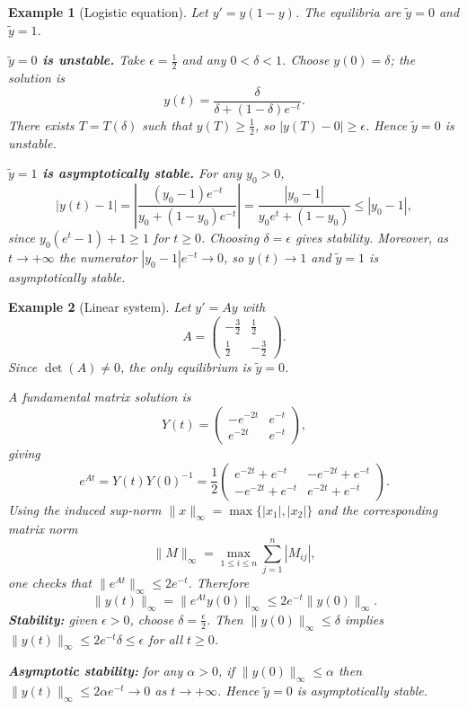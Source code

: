 \documentclass{article}
\newtheorem*{example}{Example}
\begin{document}
\begin{example}[Logistic equation]
    Let $y' = y(1-y)$. The equilibria are $\tilde{y} = 0$ and $\tilde{y} = 1$.

    \textbf{$\tilde{y} = 0$ is unstable.} Take $\epsilon = \tfrac{1}{2}$ and any $0 < \delta < 1$. Choose $y(0) = \delta$; the solution is
    \[y(t) = \frac{\delta}{\delta + (1-\delta)e^{-t}}.\]
    There exists $T = T(\delta)$ such that $y(T) \geq \tfrac{1}{2}$, so $|y(T) - 0| \geq \epsilon$. Hence $\tilde{y} = 0$ is unstable.

    \textbf{$\tilde{y} = 1$ is asymptotically stable.} For any $y_0 > 0$,
    \[|y(t) - 1| = \left|\frac{(y_0-1)e^{-t}}{y_0 + (1-y_0)e^{-t}}\right| = \frac{|y_0-1|}{y_0 e^t + (1-y_0)} \leq |y_0 - 1|,\]
    since $y_0(e^t - 1) + 1 \geq 1$ for $t \geq 0$. Choosing $\delta = \epsilon$ gives stability. Moreover, as $t \to +\infty$ the numerator $|y_0 - 1|e^{-t} \to 0$, so $y(t) \to 1$ and $\tilde{y} = 1$ is asymptotically stable.
\end{example}

\begin{example}[Linear system]
    Let $y' = Ay$ with
    \[A = \begin{pmatrix}-\tfrac{3}{2} & \tfrac{1}{2} \\ \tfrac{1}{2} & -\tfrac{3}{2}\end{pmatrix}.\]
    Since $\det(A) \neq 0$, the only equilibrium is $\tilde{y} = 0$. 
    
    A fundamental matrix solution is
    \[Y(t) = \begin{pmatrix}-e^{-2t} & e^{-t} \\ e^{-2t} & e^{-t}\end{pmatrix},\]
    giving
    \[e^{At} = Y(t)Y(0)^{-1} = \frac{1}{2}\begin{pmatrix}e^{-2t}+e^{-t} & -e^{-2t}+e^{-t} \\ -e^{-2t}+e^{-t} & e^{-2t}+e^{-t}\end{pmatrix}.\]
    Using the induced sup-norm $\|x\|_\infty = \max\{|x_1|,|x_2|\}$ and the corresponding matrix norm
    \[\|M\|_\infty = \max_{1 \leq i \leq n}\sum_{j=1}^{n}|M_{ij}|,\]
    one checks that $\|e^{At}\|_\infty \leq 2e^{-t}$. Therefore
    \[\|y(t)\|_\infty = \|e^{At}y(0)\|_\infty \leq 2e^{-t}\|y(0)\|_\infty.\]
    \textbf{Stability:} given $\epsilon > 0$, choose $\delta = \tfrac{\epsilon}{2}$. Then $\|y(0)\|_\infty \leq \delta$ implies $\|y(t)\|_\infty \leq 2e^{-t}\delta \leq \epsilon$ for all $t \geq 0$.

    \textbf{Asymptotic stability:} for any $\alpha > 0$, if $\|y(0)\|_\infty \leq \alpha$ then $\|y(t)\|_\infty \leq 2\alpha e^{-t} \to 0$ as $t \to +\infty$. Hence $\tilde{y} = 0$ is asymptotically stable.
\end{example}
\end{document}
